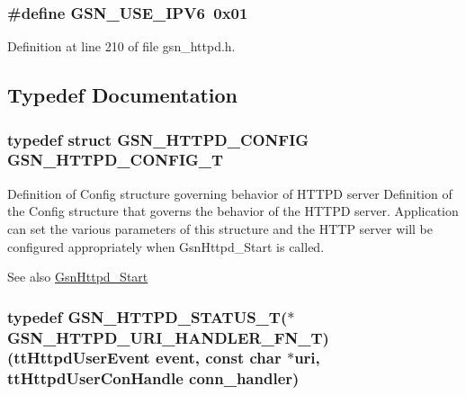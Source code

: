 \hypertarget{a00666_ga96878e559c11f82897b9a300d88d376c}{
\subsubsection[{GSN\_\-USE\_\-IPV6}]{\setlength{\rightskip}{0pt plus 5cm}\#define GSN\_\-USE\_\-IPV6~0x01}}
\label{a00666_ga96878e559c11f82897b9a300d88d376c}


Definition at line 210 of file gsn\_\-httpd.h.



\subsection{Typedef Documentation}
\hypertarget{a00666_ga5049df4d9f9df24293e341c70976f6c3}{
\subsubsection[{GSN\_\-HTTPD\_\-CONFIG\_\-T}]{\setlength{\rightskip}{0pt plus 5cm}typedef struct {\bf GSN\_\-HTTPD\_\-CONFIG}  {\bf GSN\_\-HTTPD\_\-CONFIG\_\-T}}}
\label{a00666_ga5049df4d9f9df24293e341c70976f6c3}


Definition of Config structure governing behavior of HTTPD server Definition of the Config structure that governs the behavior of the HTTPD server. Application can set the various parameters of this structure and the HTTP server will be configured appropriately when GsnHttpd\_\-Start is called. 

\begin{DoxySeeAlso}{See also}
\hyperlink{a00666_gae82a556385532a5c373c2c9700fa0959}{GsnHttpd\_\-Start} 
\end{DoxySeeAlso}
\hypertarget{a00666_ga37351c58635a4a2a10675d5ea28e37be}{
\subsubsection[{GSN\_\-HTTPD\_\-URI\_\-HANDLER\_\-FN\_\-T}]{\setlength{\rightskip}{0pt plus 5cm}typedef {\bf GSN\_\-HTTPD\_\-STATUS\_\-T}($\ast$ {\bf GSN\_\-HTTPD\_\-URI\_\-HANDLER\_\-FN\_\-T})(ttHttpdUserEvent event, const char $\ast$uri, ttHttpdUserConHandle conn\_\-handler)}}
\label{a00666_ga37351c58635a4a2a10675d5ea28e37be}


